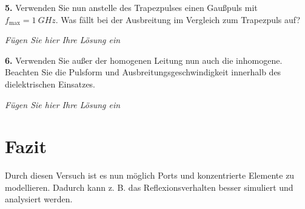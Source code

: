 \documentclass[Protokollheft.tex]{subfiles}
\begin{document}
\begin{framed}
	\noindent \textbf{5.} Verwenden Sie nun anstelle des Trapezpulses einen Gaußpuls
mit $f_{\text{max}}=\SI{1}{GHz}$. Was fällt bei der Ausbreitung im Vergleich
zum Trapezpuls auf?\label{exer:gaussExcitation}
\end{framed}

\emph{Fügen Sie hier Ihre Lösung ein}

\begin{framed}
	\noindent \textbf{6.} Verwenden Sie außer der homogenen Leitung nun auch die
inhomogene. Beachten Sie die Pulsform und
Ausbreitungsgeschwindigkeit innerhalb des dielektrischen
Einsatzes.\label{exer:inhomogenTLine}
\end{framed}

\emph{Fügen Sie hier Ihre Lösung ein}



\section{Fazit}
Durch diesen Versuch ist es nun möglich Ports und konzentrierte Elemente zu modellieren. Dadurch kann z. B. das Reflexionsverhalten besser simuliert und analysiert werden.
\end{document}
